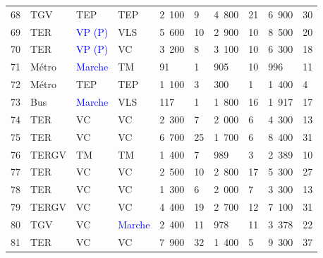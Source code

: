 \begin{longtable}{p{0.7cm}p{1.4cm}p{1.4cm}p{1.6cm}p{0.8cm}p{0.8cm}p{0.8cm}p{0.8cm}p{1.1cm}p{1.1cm}}
    \small{68} & \small{TGV} & \small{TEP} & \small{TEP} & \small{2~100} & \small{9} & \small{4~800} & \small{21} & \small{6~900} & \small{30} \\
    \small{69} & \small{TER} & \small{\textcolor{blue}{VP (P)}} & \small{VLS} & \small{5~600} & \small{10} & \small{2~900} & \small{10} & \small{8~500} & \small{20} \\
    \small{70} & \small{TER} & \small{\textcolor{blue}{VP (P)}} & \small{VC} & \small{3~200} & \small{8} & \small{3~100} & \small{10} & \small{6~300} & \small{18} \\
    \small{71} & \small{Métro} & \small{\textcolor{blue}{Marche}} & \small{TM} & \small{91} & \small{1} & \small{905} & \small{10} & \small{996} & \small{11} \\
    \small{72} & \small{Métro} & \small{TEP} & \small{TEP} & \small{1~100} & \small{3} & \small{300} & \small{1} & \small{1~400} & \small{4} \\
    \small{73} & \small{Bus} & \small{\textcolor{blue}{Marche}} & \small{VLS} & \small{117} & \small{1} & \small{1~800} & \small{16} & \small{1~917} & \small{17} \\
    \small{74} & \small{TER} & \small{VC} & \small{VC} & \small{2~300} & \small{7} & \small{2~000} & \small{6} & \small{4~300} & \small{13} \\
    \small{75} & \small{TER} & \small{VC} & \small{VC} & \small{6~700} & \small{25} & \small{1~700} & \small{6} & \small{8~400} & \small{31} \\
    \small{76} & \small{TERGV} & \small{TM} & \small{TM} & \small{1~400} & \small{7} & \small{989} & \small{3} & \small{2~389} & \small{10} \\
    \small{77} & \small{TER} & \small{VC} & \small{VC} & \small{2~500} & \small{10} & \small{2~800} & \small{17} & \small{5~300} & \small{27} \\
    \small{78} & \small{TER} & \small{VC} & \small{VC} & \small{1~300} & \small{6} & \small{2~000} & \small{7} & \small{3~300} & \small{13} \\
    \small{79} & \small{TERGV} & \small{VC} & \small{VC} & \small{4~400} & \small{19} & \small{2~700} & \small{12} & \small{7~100} & \small{31} \\
    \small{80} & \small{TGV} & \small{VC} & \small{\textcolor{blue}{Marche}} & \small{2~400} & \small{11} & \small{978} & \small{11} & \small{3~378} & \small{22} \\
    \small{81} & \small{TER} & \small{VC} & \small{VC} & \small{7~900} & \small{32} & \small{1~400} & \small{5} & \small{9~300} & \small{37} \\

\end{longtable}
